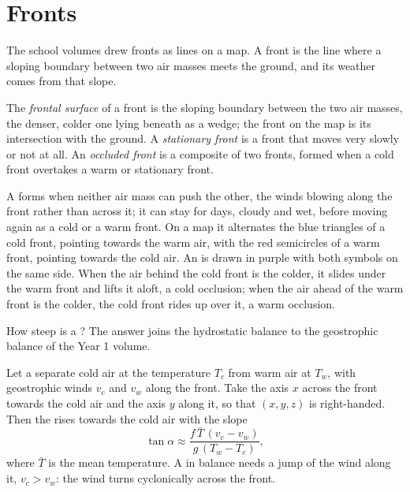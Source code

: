 \section{Fronts}\label{sec:b2:weather-systems:fronts}

The school volumes drew fronts as lines on a map. A front is the line where a sloping boundary
between two air masses meets the ground, and its weather comes from that slope.

\begin{definition}\label{def:b2:weather-systems:fronts}
The \emph{frontal surface} of a front is the sloping boundary between
the two air masses, the denser, colder one lying beneath as a wedge; the front on the map is its
intersection with the ground. A \emph{stationary front} is a front
that moves very slowly or not at all. An \emph{occluded front} is a
composite of two fronts, formed when a cold front overtakes a warm or stationary front.
\end{definition}

A  forms when neither air mass can push the other, the winds blowing along the
front rather than across it; it can stay for days, cloudy and wet, before moving again as a cold
or a warm front. On a map it alternates the blue triangles of a cold front, pointing towards the
warm air, with the red semicircles of a warm front, pointing towards the cold air. An  is drawn in purple with both symbols on the same side. When the air behind the cold front
is the colder, it slides under the warm front and lifts it aloft, a cold occlusion; when the air
ahead of the warm front is the colder, the cold front rides up over it, a warm occlusion.

How steep is a ? The answer joins the hydrostatic balance to the geostrophic
balance of the Year 1 volume.

\begin{proposition}\label{prop:b2:weather-systems:slope}
Let a  separate cold air at the temperature $T_c$ from warm air at $T_w$, with
geostrophic winds $v_c$ and $v_w$ along the front. Take the axis $x$ across the front towards the
cold air and the axis $y$ along it, so that $(x, y, z)$ is right-handed. Then the  rises towards the cold air with the slope
\[
  \tan\alpha \approx \frac{f\,\bar T\,(v_c - v_w)}{g\,(T_w - T_c)},
\]
where $\bar T$ is the mean temperature. A  in balance needs a jump of the wind
along it, $v_c > v_w$: the wind turns cyclonically across the front.
\end{proposition}

